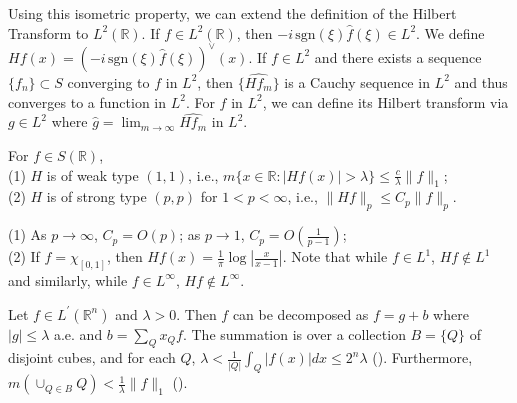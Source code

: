 Using this isometric property, we can extend the definition of the Hilbert Transform to $L^2(\mathbb{R})$. If $f \in L^2(\mathbb{R})$, then $-i \, \text{sgn}(\xi) \hat{f}(\xi) \in L^2$. We define $Hf(x) = (-i \, \text{sgn}(\xi) \hat{f}(\xi))^\vee(x)$. If $f \in L^2$ and there exists a sequence $\{f_n\} \subset S$ converging to $f$ in $L^2$, then $\{\hat{Hf_m}\}$ is a Cauchy sequence in $L^2$ and thus converges to a function in $L^2$.
For $f$ in $L^2$, we can define its Hilbert transform via $g \in L^2$ where $\hat{g} = \lim_{{m \to \infty}} \widehat{H f_m}$ in $L^2$.

\begin{theorem}\label{thm3.1.6}
    For $f \in S(\mathbb{R})$,\\
(1) $H$ is of weak type $(1,1)$, i.e., $m\{x \in \mathbb{R}: |H f(x)| > \lambda\} \leqslant \frac{c}{\lambda} \|f\|_1$;\\
(2) $H$ is of strong type $(p, p)$ for $1 < p < \infty$, i.e., $\|H f\|_p \leqslant C_p \|f\|_p$.
\end{theorem} 
\begin{rmk}
    (1) As $p \to \infty$, $C_p = O(p)$; as $p \to 1$, $C_p = O\left(\frac{1}{p-1}\right)$;\\
(2) If $f = \chi_{[0,1]}$, then $H f(x) = \frac{1}{\pi} \log \left|\frac{x}{x-1}\right|$. Note that while $f \in L^1$, $H f \notin L^1$ and similarly, while $f \in L^{\infty}$, $H f \notin L^{\infty}$.
\end{rmk}
\begin{lemma}
    Let $f \in L^{\prime}\left(\mathbb{R}^n\right)$ and $\lambda > 0$. Then $f$ can be decomposed as $f = g + b$ where $|g| \leqslant \lambda$ a.e. and $b = \sum_Q x_Q f$. The summation is over a collection $B = \{Q\}$ of disjoint cubes, and for each $Q$, $\lambda < \frac{1}{|Q|} \int_Q |f(x)| dx \leqslant 2^n \lambda $ (). Furthermore, $m\left(\cup_{Q \in B} Q\right) < \frac{1}{\lambda} \|f\|_1$ ().
\end{lemma}
